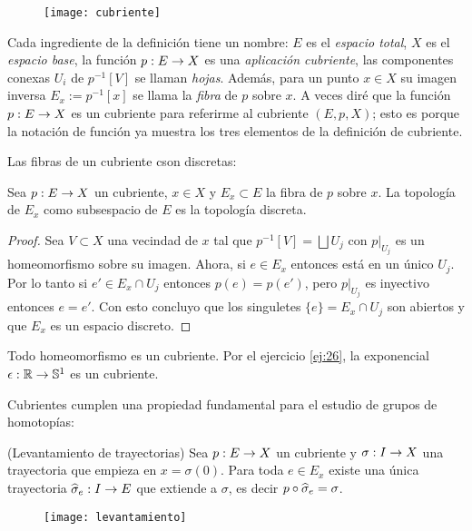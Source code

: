 \documentclass[../../topologia_algebraica]{subfiles}
\begin{document}
\begin{figure}[ht]%
  \centering
  \texttt{[image: cubriente]}
\end{figure}%


Cada ingrediente de la definici\'on tiene un nombre: $E$ es el \emph{espacio total}, $X$ es el
\emph{espacio base}, la funci\'on $p:E\rightarrow X$ es una \emph{aplicaci\'on cubriente}, las
componentes conexas $U_i$ de $p^{-1}[V]$ se llaman \emph{hojas}. Adem\'as, para un punto
$x\in X$ su imagen inversa $E_x:=p^{-1}[x]$ se llama la \emph{fibra} de $p$ sobre $x$.
A veces dir\'e que la funci\'on $p:E\rightarrow X$ es un cubriente para referirme al cubriente $(E,p,X)$;
esto es porque la notaci\'on de funci\'on ya muestra los tres elementos de la definici\'on de
cubriente.

Las fibras de un cubriente cson discretas:
\begin{prop}
  Sea $p:E\rightarrow X$ un cubriente, $x\in X$ y $E_x\subset E$ la fibra de $p$ sobre $x$. La
  topolog\'ia de $E_x$ como subsespacio de $E$ es la topolog\'ia discreta. 
\end{prop}
\begin{proof}
  Sea $V\subset X$ una vecindad de $x$ tal que $p^{-1}[V]=\bigsqcup U_j$ con $p|_{U_j}$
  es un homeomorfismo sobre su imagen. Ahora, si $e\in E_x$ entonces est\'a en un
  \'unico $U_j$. Por lo tanto si $e'\in E_x\cap U_j$ entonces $p(e)=p(e')$, pero
  $p|_{U_j}$ es inyectivo entonces $e=e'$. Con esto concluyo que los singuletes
  $\{e\}=E_x\cap U_j$ son abiertos y que $E_x$ es un espacio discreto.
\end{proof}

\begin{ejemplo}
  Todo homeomorfismo es un cubriente. Por el ejercicio \ref{ej:26}, la exponencial
  $\epsilon:\mathbb{R}\rightarrow\mathbb{S}^1$ es un cubriente.
\end{ejemplo}

Cubrientes cumplen una propiedad fundamental para el estudio de grupos de homotop\'ias:

\begin{thm}\label{thm:levantamiento}(Levantamiento de trayectorias)
  Sea $p:E\rightarrow X$ un cubriente y $\sigma:I\rightarrow X$ una trayectoria que empieza en $x=\sigma(0)$.
  Para toda $e\in E_{x}$ existe una \'unica trayectoria $\widehat{ \sigma }_e:I\rightarrow E$ que extiende
  a $\sigma$, es decir $p\circ\widehat{ \sigma }_e=\sigma$.
\end{thm}
\begin{figure}[ht]
  \centering
    \texttt{[image: levantamiento]}
\end{figure}
\end{document}
